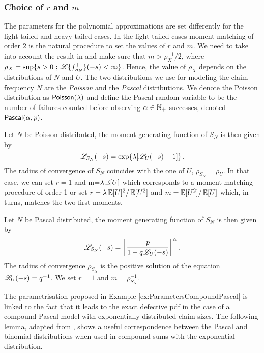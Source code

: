 \subsubsection{Choice of $r$ and $m$}\label{ssec:ChoosingmAndr}
The parameters for the polynomial approximations are set differently for the light-tailed and heavy-tailed cases. In the light-tailed cases moment matching of order $2$ is the natural procedure to set the values of $r$ and $m$. We need to take into account the result in  and make sure that $m>\rho_X^{-1}/2$, where $\rho_X=\sup\{s>0\text{ ; }\mathscr{L}\{f_{S_N}^{+}\}(-s)<\infty\}$. Hence, the value of $\rho_X$ depends on the distributions of $N$ and $U$. The two distributions we use for modeling the claim frequency $N$ are the \emph{Poisson} and the \emph{Pascal} distributions. We denote the Poisson distribution as $\mathsf{Poisson}(\lambda)$ and define the Pascal random variable to be the number of failures counted before observing $\alpha \in \mathbb{N}_+$ successes, denoted $\mathsf{Pascal}(\alpha,p)$.
\begin{example}\label{ex:ParametersCompoundPoisson}
Let $N$ be Poisson distributed, the moment generating function of $S_N$ is then given by
\[
\mathscr{L}_{S_N}(-s)=\exp \{ \lambda [ \mathscr{L}_{U}(-s)-1 ] \} \,.
\]
The radius of convergence of $S_N$ coincides with the one of $U$, $\rho_{S_N}=\rho_U$. In  that case, we can set $r=1$ and m=$\lambda\operatorname{{\mathbb E}}[U]$ which corresponds to a moment matching procedure of order 1 or set $r=\lambda\operatorname{{\mathbb E}}[U]^2/\operatorname{{\mathbb E}}[U^2]$ and $m=\operatorname{{\mathbb E}}[U^2]/\operatorname{{\mathbb E}}[U]$ which, in turns, matches the two first moments.
\end{example}
\begin{example}\label{ex:ParametersCompoundPascal}
Let $N$ be Pascal distributed, the moment generating function of $S_N$ is then given by
$$
\mathscr{L}_{S_N}(-s)=\left[\frac{p}{1-q\mathscr{L}_{U}(-s)}\right]^{\alpha}.
$$
The radius of convergence $\rho_{S_N}$ is the positive solution of the equation $\mathscr{L}_{U}(-s)=q^{-1}$. We set $r=1$ and $m=\rho_{S_N}^{-1}$.
\end{example}
The parametrisation proposed in Example \ref{ex:ParametersCompoundPascal} is linked to the fact that it leads to the exact defective pdf in the case of a compound Pascal model with exponentially distributed claim sizes.
 The following lemma, adapted from \cite{PaWi81}, shows a useful correspondence between the Pascal and binomial distributions when used in compound sums with the exponential distribution.
